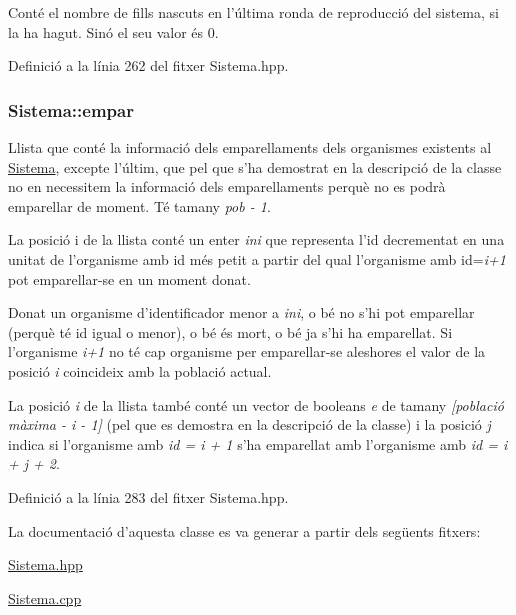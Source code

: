 Conté el nombre de fills nascuts en l'última ronda de reproducció del sistema, si la ha hagut. Sinó el seu valor és 0. 



Definició a la línia 262 del fitxer Sistema.\-hpp.

\hypertarget{class_sistema_a98845ff9b4955ce24f2378d90ca135aa}{
\subsubsection[{empar}]{ Sistema\-::empar\hspace{0.3cm}{\ttfamily [private]}}}\label{class_sistema_a98845ff9b4955ce24f2378d90ca135aa}


Llista que conté la informació dels emparellaments dels organismes existents al \hyperlink{class_sistema}{Sistema}, excepte l'últim, que pel que s'ha demostrat en la descripció de la classe no en necessitem la informació dels emparellaments perquè no es podrà emparellar de moment. Té tamany {\itshape pob -\/ 1}.\par
 La posició i de la llista conté un enter {\itshape ini} que representa l'id decrementat en una unitat de l'organisme amb id més petit a partir del qual l'organisme amb id={\itshape i+1} pot emparellar-\/se en un moment donat. \par
Donat un organisme d'identificador menor a {\itshape ini}, o bé no s'hi pot emparellar (perquè té id igual o menor), o bé és mort, o bé ja s'hi ha emparellat. Si l'organisme {\itshape i+1} no té cap organisme per emparellar-\/se aleshores el valor de la posició {\itshape i} coincideix amb la població actual. \par
La posició {\itshape i} de la llista també conté un vector de booleans {\itshape e} de tamany {\itshape \mbox{[}població màxima -\/ i -\/ 1\mbox{]}} (pel que es demostra en la descripció de la classe) i la posició {\itshape j} indica si l'organisme amb {\itshape id = i + 1} s'ha emparellat amb l'organisme amb {\itshape id = i + j + 2}. 



Definició a la línia 283 del fitxer Sistema.\-hpp.



La documentació d'aquesta classe es va generar a partir dels següents fitxers\-:\begin{DoxyCompactItemize}
\item 
\hyperlink{_sistema_8hpp}{Sistema.\-hpp}\item 
\hyperlink{_sistema_8cpp}{Sistema.\-cpp}\end{DoxyCompactItemize}
